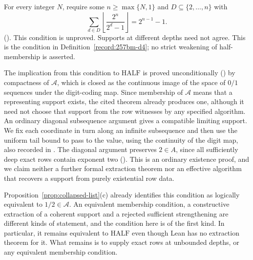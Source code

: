 \begin{defn}
For every integer $N$, require some $n\ge\max\{N,1\}$ and
$D\subseteq\{2,\ldots,n\}$ with
\[
 \sum_{d\in D}\left\lfloor\frac{2^n}{2^d-1}\right\rfloor
       =2^{n-1}-1.
\]
().  This
condition is unproved.  Supports at different depths need not agree.
This is the condition in Definition~\ref{record:257bm-d4};
no strict weakening of half-membership is asserted.
\end{defn}
The implication from this condition to $\mathrm{HALF}$ is proved unconditionally
()
by compactness of $\mathcal{A}$, which is closed as the continuous image of the space of $0/1$
sequences under the digit-coding map.
Since membership of $\mathcal A$ means that a representing support exists,
the cited theorem already produces one, although it need not
choose that support from the row witnesses by any specified algorithm.
An ordinary diagonal subsequence argument gives a compatible limiting
support. We fix each coordinate in turn along an infinite
subsequence and then use the uniform tail bound to pass to the value,
using the continuity of the digit map, also recorded in
.  The diagonal argument preserves $2\in A$, since all sufficiently deep exact rows
contain exponent two
().
This is an ordinary existence proof, and we claim neither a further
formal extraction theorem nor an effective algorithm that recovers a support from purely
existential row data.

Proposition~\ref{prop:collapsed-list}(c) already identifies
this condition as logically equivalent to $1/2\in\mathcal{A}$.
An equivalent membership condition, a constructive extraction of a coherent support and a
rejected sufficient strengthening are different kinds of statement, and the condition here
is of the first kind.  In particular, it remains equivalent to $\mathrm{HALF}$ even though
Lean has no extraction theorem for it.
What remains is to supply exact rows at unbounded depths, or any equivalent
membership condition.

